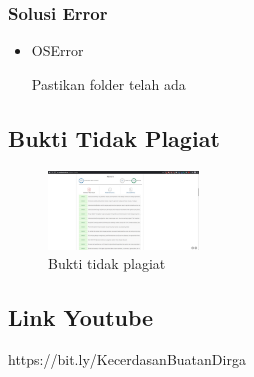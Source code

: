 \subsubsection{Solusi Error}
\hfill\break
\begin{itemize}
\item OSError

Pastikan folder telah ada
\end{itemize}

\subsection{Bukti Tidak Plagiat}
\begin{figure}[H]
	\includegraphics[width=4cm]{figures/1174066/8/buktiplagiat.jpg}
	\centering
	\caption{Bukti tidak plagiat}
\end{figure}

\subsection{Link Youtube}
https://bit.ly/KecerdasanBuatanDirga